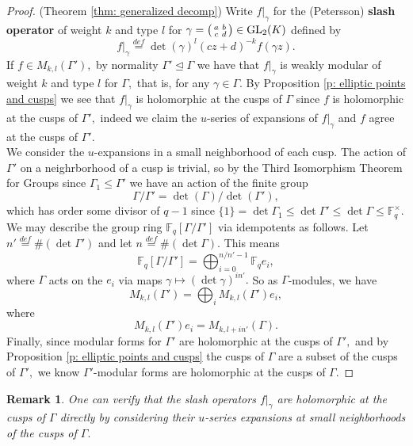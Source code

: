 \documentclass[11pt]{amsart}
\newtheorem{remark}[theorem]{Remark}
\theoremstyle{definition}
\newenvironment{psmallmatrix}
{\left(\begin{smallmatrix}}
	{\end{smallmatrix}\right)}
\numberwithin{equation}{section}
\newcommand{\GL}{\mathrm{GL}} 	%
\newcommand{\bbF}{\mathbb{F}}		%
\begin{document}
\begin{proof}(Theorem \ref{thm: generalized decomp})
	Write $f|_{\gamma}$ for the (Petersson) \textbf{slash operator} of weight $k$ and type $l$ for $\displaystyle{\gamma=\begin{psmallmatrix}a&b\\c&d\end{psmallmatrix}\in \GL_2(K)}$ defined by \[f|_{\gamma}\overset{def}{=}\det(\gamma)^l(cz+d)^{-k}f(\gamma z).\] If $f\in M_{k,l}(\Gamma'),$ by normality $\Gamma'\unlhd \Gamma$ we have that $f|_{\gamma}$ is weakly modular of weight $k$ and type $l$ for $\Gamma,$ that is, for any $\gamma\in \Gamma.$ By Proposition \ref{p: elliptic points and cusps} we see that $f|_{\gamma}$ is holomorphic at the cusps of $\Gamma$ since $f$ is holomorphic at the cusps of $\Gamma',$ indeed we claim the $u$-series of expansions of $f|_{\gamma}$ and $f$ agree at the cusps of $\Gamma'.$\\
	
	We consider the $u$-expansions in a small neighborhood of each cusp. The action of $\Gamma'$ on a neighrborhood of a cusp is trivial, so by the Third Isomorphism Theorem for Groups since $\Gamma_1\leq \Gamma'$ we have an action of the finite group \[\Gamma/\Gamma'=\det(\Gamma)/\det(\Gamma'),\] which has order some divisor of $q-1$ since $\{1\}=\det \Gamma_1\leq \det\Gamma'\leq \det\Gamma\leq \bbF_q^{\times}.$ We may describe the group ring $\bbF_q[\Gamma/\Gamma']$ via idempotents as follows. Let $n'\overset{def}{=}\#(\det\Gamma')$ and let $n\overset{def}{=}\#(\det\Gamma).$ This means 
	\[\bbF_q[\Gamma/\Gamma']=\bigoplus_{i=0}^{n/n'-1}\bbF_qe_i,\]
	where $\Gamma$ acts on the $e_i$ via maps $\gamma\mapsto (\det\gamma)^{in'}.$ So as $\Gamma$-modules, we have \[M_{k,l}(\Gamma')=\bigoplus_i M_{k,l}(\Gamma')e_i,\] where \[M_{k,l}(\Gamma')e_i=M_{k,l+in'}(\Gamma).\] Finally, since modular forms for $\Gamma'$ are holomorphic at the cusps of $\Gamma',$ and by Proposition \ref{p: elliptic points and cusps} the cusps of $\Gamma$ are a subset of the cusps of $\Gamma',$ we know $\Gamma'$-modular forms are holomorphic at the cusps of $\Gamma.$
\end{proof}

\begin{remark}
	One can verify that the slash operators $f|_{\gamma}$ are holomorphic at the cusps of $\Gamma$ directly by considering their $u$-series expansions at small neighborhoods of the cusps of $\Gamma.$
\end{remark}
\end{document}
